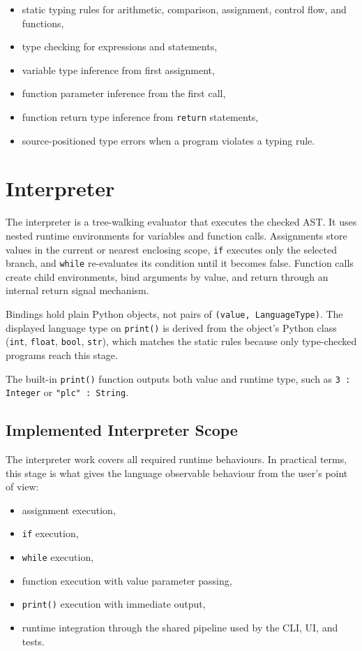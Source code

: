 \begin{itemize}
	\item static typing rules for arithmetic, comparison, assignment, control flow, and functions,
	\item type checking for expressions and statements,
	\item variable type inference from first assignment,
	\item function parameter inference from the first call,
	\item function return type inference from \texttt{return} statements,
	\item source-positioned type errors when a program violates a typing rule.
\end{itemize}

\section{Interpreter}
The interpreter is a tree-walking evaluator that executes the checked AST. It
uses nested runtime environments for variables and function calls. Assignments
store values in the current or nearest enclosing scope, \texttt{if} executes
only the selected branch, and \texttt{while} re-evaluates its condition until it
becomes false. Function calls create child environments, bind arguments by
value, and return through an internal return signal mechanism.

Bindings hold plain Python objects, not pairs of \texttt{(value, LanguageType)}.
The displayed language type on \texttt{print()} is derived from the object's
Python class (\texttt{int}, \texttt{float}, \texttt{bool}, \texttt{str}),
which matches the static rules because only type-checked programs reach this stage.

The built-in \texttt{print()} function outputs both value and runtime type, such
as \texttt{3 : Integer} or \texttt{"plc" : String}.

\subsection{Implemented Interpreter Scope}
The interpreter work covers all required runtime behaviours. In practical terms,
this stage is what gives the language observable behaviour from the user's point
of view:

\begin{itemize}
	\item assignment execution,
	\item \texttt{if} execution,
	\item \texttt{while} execution,
	\item function execution with value parameter passing,
	\item \texttt{print()} execution with immediate output,
	\item runtime integration through the shared pipeline used by the CLI, UI, and tests.
\end{itemize}

